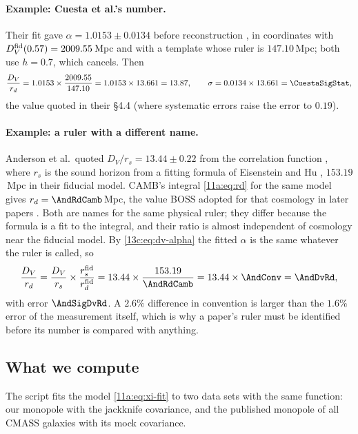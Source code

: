 \paragraph{Example: Cuesta et al.'s number.}
Their fit gave $\alpha=1.0153\pm0.0134$ before reconstruction
, in coordinates with $D_V^{\rm fid}(0.57)=2009.55$\,Mpc
and with a template whose ruler is $147.10$\,Mpc; both use $h=0.7$, which cancels.
Then
\begin{equation*}
  \frac{D_V}{r_d}=1.0153\times\frac{2009.55}{147.10}=1.0153\times13.661=13.87,
  \qquad
  \sigma=0.0134\times13.661=\CuestaSigStat,
\end{equation*}
the value quoted in their \S4.4 (where systematic errors raise the error to $0.19$).

\paragraph{Example: a ruler with a different name.}
Anderson et al.\ quoted $D_V/r_s=13.44\pm0.22$ from the correlation function
, where $r_s$ is the sound horizon from a fitting
formula of Eisenstein and Hu \cite{EisensteinHu1998}, $153.19$\,Mpc in their fiducial
model. CAMB's integral \eqref{11a:eq:rd} for the same model gives $r_d=\AndRdCamb$\,Mpc,
the value BOSS adopted for that cosmology in later papers
. Both are names for the same physical ruler; they differ
because the formula is a fit to the integral, and their ratio is almost independent of
cosmology near the fiducial model. By \eqref{13c:eq:dv-alpha} the fitted $\alpha$ is
the same whatever the ruler is called, so
\begin{equation*}
  \frac{D_V}{r_d}=\frac{D_V}{r_s}\times\frac{r_s^{\rm fid}}{r_d^{\rm fid}}
  =13.44\times\frac{153.19}{\AndRdCamb}=13.44\times\AndConv=\AndDvRd,
\end{equation*}
with error $\AndSigDvRd$. A $2.6\%$ difference in convention is larger than the
$1.6\%$ error of the measurement itself, which is why a paper's ruler must be
identified before its number is compared with anything.

\subsection{What we compute}
\label{13c:sec:repro-code}

The script  fits the model \eqref{11a:eq:xi-fit} to two data
sets with the same function: our monopole with the jackknife covariance, and the
published monopole of all CMASS galaxies with its mock covariance.

